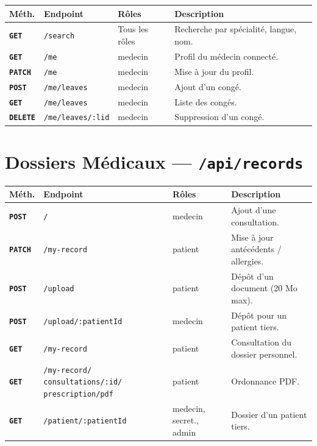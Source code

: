 \documentclass[12pt,a4paper]{report}
\newcommand{\method}[1]{\texttt{\textcolor{MedTealDark}{\bfseries#1}}}
\begin{document}
\begin{center}
\small
\begin{tabular}{@{} l p{4.5cm} p{4cm} p{4.5cm} @{}}
  \toprule
  \textbf{Méth.} & \textbf{Endpoint} & \textbf{Rôles} & \textbf{Description} \\
  \midrule
  \method{GET}    & \texttt{/search}       & Tous les rôles & Recherche par spécialité, langue, nom. \\
  \method{GET}    & \texttt{/me}           & medecin        & Profil du médecin connecté. \\
  \method{PATCH}  & \texttt{/me}           & medecin        & Mise à jour du profil. \\
  \method{POST}   & \texttt{/me/leaves}    & medecin        & Ajout d'un congé. \\
  \method{GET}    & \texttt{/me/leaves}    & medecin        & Liste des congés. \\
  \method{DELETE} & \texttt{/me/leaves/:lid} & medecin      & Suppression d'un congé. \\
  \bottomrule
\end{tabular}
\end{center}

\section{Dossiers Médicaux — \texttt{/api/records}}

\begin{center}
\small
\begin{tabular}{@{} l p{5.5cm} p{3.2cm} p{3.8cm} @{}}
  \toprule
  \textbf{Méth.} & \textbf{Endpoint} & \textbf{Rôles} & \textbf{Description} \\
  \midrule
  \method{POST}  & \texttt{/}                    & medecin              & Ajout d'une consultation. \\
  \method{PATCH} & \texttt{/my-record}           & patient              & Mise à jour antécédents / allergies. \\
  \method{POST}  & \texttt{/upload}              & patient              & Dépôt d'un document (20 Mo max). \\
  \method{POST}  & \texttt{/upload/:patientId}   & medecin              & Dépôt pour un patient tiers. \\
  \method{GET}   & \texttt{/my-record}           & patient              & Consultation du dossier personnel. \\
  \method{GET}   & \texttt{/my-record/}%
                   \texttt{consultations/:id/}%
                   \texttt{prescription/pdf}      & patient              & Ordonnance PDF. \\
  \method{GET}   & \texttt{/patient/:patientId}  & medecin, secret., admin & Dossier d'un patient tiers. \\
  \bottomrule
\end{tabular}
\end{center}
\end{document}
